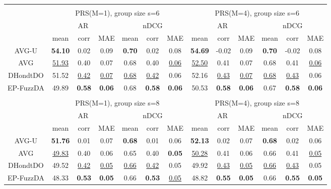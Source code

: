 \begin{tabular}{ c | c c c | c c c || c c c | c c c}
\multicolumn{12}{c}{} \\
\multicolumn{1}{c}{} & \multicolumn{6}{c}{PRS(M=1), group size s=6} & \multicolumn{6}{c}{PRS(M=4), group size s=6} \\
\multicolumn{1}{c}{} & \multicolumn{3}{c}{AR} & \multicolumn{3}{c}{nDCG} & \multicolumn{3}{c}{AR} & \multicolumn{3}{c}{nDCG} \\
& mean & corr & MAE & mean & corr & MAE & mean & corr & MAE & mean & corr & MAE \\
\hline
AVG-U & \textbf{54.10} & 0.02 & 0.09 & \textbf{0.70} & 0.02 & 0.08 & \textbf{54.69} & -0.02 & 0.09 & \textbf{0.70} & -0.02 & 0.08 \\
AVG & \underline{51.93} & 0.40 & 0.07 & 0.68 & 0.40 & \underline{0.06} & \underline{52.50} & 0.41 & 0.07 & 0.68 & 0.41 & \underline{0.06} \\
DHondtDO & 51.52 & \underline{0.42} & \underline{0.07} & \underline{0.68} & \underline{0.42} & 0.06 & 52.16 & \underline{0.43} & \underline{0.07} & \underline{0.68} & \underline{0.43} & 0.06 \\
EP-FuzzDA & 49.89 & \textbf{0.58} & \textbf{0.06} & 0.68 & \textbf{0.58} & \textbf{0.06} & 50.53 & \textbf{0.58} & \textbf{0.06} & 0.67 & \textbf{0.58} & \textbf{0.06} \\

\multicolumn{12}{c}{} \\
\multicolumn{1}{c}{} & \multicolumn{6}{c}{PRS(M=1), group size s=8} & \multicolumn{6}{c}{PRS(M=4), group size s=8} \\
\multicolumn{1}{c}{} & \multicolumn{3}{c}{AR} & \multicolumn{3}{c}{nDCG} & \multicolumn{3}{c}{AR} & \multicolumn{3}{c}{nDCG} \\
& mean & corr & MAE & mean & corr & MAE & mean & corr & MAE & mean & corr & MAE \\
\hline
AVG-U & \textbf{51.76} & 0.01 & 0.07 & \textbf{0.68} & 0.01 & 0.06 & \textbf{52.13} & 0.02 & 0.07 & \textbf{0.68} & 0.02 & 0.06 \\
AVG & \underline{49.83} & 0.40 & 0.06 & 0.65 & 0.40 & \textbf{0.05} & \underline{50.28} & 0.41 & 0.06 & 0.66 & 0.41 & \underline{0.05} \\
DHondtDO & 49.52 & \underline{0.42} & \underline{0.05} & \underline{0.66} & \underline{0.42} & 0.05 & 49.92 & \underline{0.43} & \underline{0.05} & \underline{0.66} & \underline{0.43} & 0.05 \\
EP-FuzzDA & 48.33 & \textbf{0.53} & \textbf{0.05} & 0.66 & \textbf{0.53} & \underline{0.05} & 48.82 & \textbf{0.55} & \textbf{0.05} & 0.66 & \textbf{0.55} & \textbf{0.05} \\

\end{tabular}

